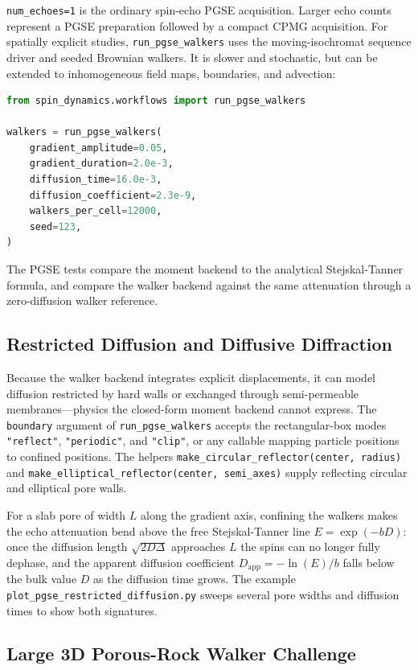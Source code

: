 \documentclass[11pt,oneside]{report}
\newcommand{\code}[1]{\texttt{#1}}
\begin{document}
\code{num\_echoes=1} is the ordinary spin-echo PGSE acquisition. Larger echo
counts represent a PGSE preparation followed by a compact CPMG acquisition.
For spatially explicit studies, \code{run\_pgse\_walkers} uses the
moving-isochromat sequence driver and seeded Brownian walkers. It is slower and
stochastic, but can be extended to inhomogeneous field maps, boundaries, and
advection:

\begin{lstlisting}[language=Python]
from spin_dynamics.workflows import run_pgse_walkers

walkers = run_pgse_walkers(
    gradient_amplitude=0.05,
    gradient_duration=2.0e-3,
    diffusion_time=16.0e-3,
    diffusion_coefficient=2.3e-9,
    walkers_per_cell=12000,
    seed=123,
)
\end{lstlisting}

The PGSE tests compare the moment backend to the analytical
Stejskal-Tanner formula, and compare the walker backend against the same
attenuation through a zero-diffusion walker reference.

\subsection{Restricted Diffusion and Diffusive Diffraction}

Because the walker backend integrates explicit displacements, it can model
diffusion restricted by hard walls or exchanged through semi-permeable
membranes---physics the closed-form moment backend cannot express. The
\code{boundary} argument of \code{run\_pgse\_walkers} accepts the rectangular-box
modes \code{"reflect"}, \code{"periodic"}, and \code{"clip"}, or any callable
mapping particle positions to confined positions. The helpers
\code{make\_circular\_reflector(center, radius)} and
\code{make\_elliptical\_reflector(center, semi\_axes)} supply reflecting circular
and elliptical pore walls.

For a slab pore of width \(L\) along the gradient axis, confining the walkers
makes the echo attenuation bend above the free Stejskal-Tanner line
\(E=\exp(-bD)\): once the diffusion length \(\sqrt{2D\Delta}\) approaches \(L\)
the spins can no longer fully dephase, and the apparent diffusion coefficient
\(D_{\mathrm{app}}=-\ln(E)/b\) falls below the bulk value \(D\) as the diffusion
time grows. The example
\code{plot\_pgse\_restricted\_diffusion.py} sweeps several pore widths and
diffusion times to show both signatures.

\subsection{Large 3D Porous-Rock Walker Challenge}
\end{document}
